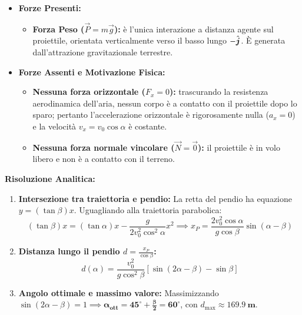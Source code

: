 \begin{tcolorbox}[enhanced, breakable, colback=forestgreen!5!white, colframe=forestgreen!80!black,
    title={\textbf{Analisi delle Forze in Gioco (Free-Body Diagram in Volo)}}, fonttitle=\bfseries\sffamily]
\begin{itemize}
    \item \textbf{Forze Presenti:}
    \begin{itemize}
        \item \textbf{Forza Peso ($\vec{P} = m\vec{g}$):} è l'unica interazione a distanza agente sul proiettile, orientata verticalmente verso il basso lungo $-\hat{\bm{j}}$. È generata dall'attrazione gravitazionale terrestre.
    \end{itemize}
    \item \textbf{Forze Assenti e Motivazione Fisica:}
    \begin{itemize}
        \item \textbf{Nessuna forza orizzontale ($F_x = 0$):} trascurando la resistenza aerodinamica dell'aria, nessun corpo è a contatto con il proiettile dopo lo sparo; pertanto l'accelerazione orizzontale è rigorosamente nulla ($a_x = 0$) e la velocità $v_x = v_0\cos\alpha$ è costante.
        \item \textbf{Nessuna forza normale vincolare ($\vec{N} = \vec{0}$):} il proiettile è in volo libero e non è a contatto con il terreno.
    \end{itemize}
\end{itemize}
\end{tcolorbox}

\textbf{Risoluzione Analitica:}
\begin{enumerate}
    \item \textbf{Intersezione tra traiettoria e pendio:}
    La retta del pendio ha equazione $y = (\tan\beta) x$. Uguagliando alla traiettoria parabolica:
    \begin{equation}
        (\tan\beta) x = (\tan\alpha) x - \frac{g}{2 v_0^2 \cos^2\alpha} x^2 \implies x_P = \frac{2 v_0^2 \cos\alpha}{g \cos\beta} \sin(\alpha - \beta)
    \end{equation}
    \item \textbf{Distanza lungo il pendio $d = \frac{x_P}{\cos\beta}$:}
    \begin{equation}
        d(\alpha) = \frac{v_0^2}{g \cos^2\beta} \left[\sin(2\alpha - \beta) - \sin\beta\right]
    \end{equation}
    \item \textbf{Angolo ottimale e massimo valore:}
    Massimizzando $\sin(2\alpha - \beta) = 1 \implies \mathbf{\alpha_{\text{ott}} = 45^\circ + \frac{\beta}{2} = 60^\circ}$, con $d_{\max} \approx \mathbf{\SI{169.9}{\metre}}$.
\end{enumerate}

